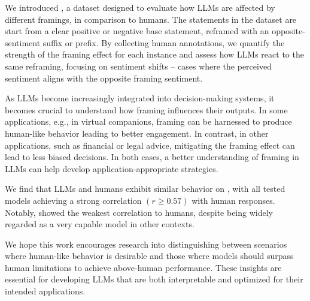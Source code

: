 
We introduced \name{}, a dataset designed to evaluate how LLMs are affected by different framings, in comparison to humans. The statements in the dataset are start from a clear positive or negative base statement, reframed with an opposite-sentiment suffix or prefix. By collecting human annotations, we quantify the strength of the framing effect for each instance and assess how LLMs react to the same reframing, focusing on sentiment shifts -- cases where the perceived sentiment aligns with the opposite framing sentiment.

As LLMs become increasingly integrated into decision-making systems, it becomes crucial to understand how framing influences their outputs. 
In some applications, e.g., in virtual companions, framing can be harnessed to produce human-like behavior leading to better engagement.
In contrast, in other applications, such as financial or legal advice, mitigating the framing effect can lead to less biased decisions.
In both cases, a better understanding of framing in LLMs can help develop application-appropriate strategies.

We find that LLMs and humans exhibit similar behavior on \name{}, with all tested models achieving a strong correlation  $(r \geq 0.57)$ with human responses. Notably, \gpt{} showed the weakest correlation to humans, despite being widely regarded as a very capable model in other contexts.

We hope this work encourages research into distinguishing between scenarios where human-like behavior is desirable and those where models should surpass human limitations to achieve above-human performance. These insights are essential for developing LLMs that are both interpretable and optimized for their intended applications.